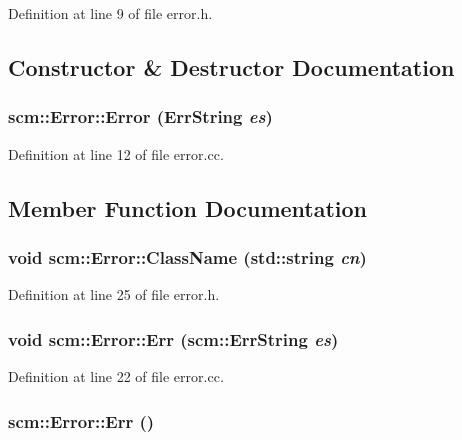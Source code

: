 Definition at line 9 of file error.h.



\subsection{Constructor \& Destructor Documentation}
\hypertarget{classscm_1_1_error_a9c6aa255ce180155a748f304f83830d3}{
\subsubsection[{Error}]{\setlength{\rightskip}{0pt plus 5cm}scm::Error::Error ({\bf ErrString} {\em es})}}
\label{classscm_1_1_error_a9c6aa255ce180155a748f304f83830d3}


Definition at line 12 of file error.cc.



\subsection{Member Function Documentation}
\hypertarget{classscm_1_1_error_a3d3598611ee2955f3144ec2602b69677}{
\subsubsection[{ClassName}]{\setlength{\rightskip}{0pt plus 5cm}void scm::Error::ClassName (std::string {\em cn})}}
\label{classscm_1_1_error_a3d3598611ee2955f3144ec2602b69677}


Definition at line 25 of file error.h.

\hypertarget{classscm_1_1_error_aa4309b2556e84bd9bc6c7871f3be2f7a}{
\subsubsection[{Err}]{\setlength{\rightskip}{0pt plus 5cm}void scm::Error::Err ({\bf scm::ErrString} {\em es})}}
\label{classscm_1_1_error_aa4309b2556e84bd9bc6c7871f3be2f7a}


Definition at line 22 of file error.cc.

\hypertarget{classscm_1_1_error_a8fa002269b2ea7b0af4581951a7908f0}{
\subsubsection[{Err}]{ scm::Error::Err ()}}
\label{classscm_1_1_error_a8fa002269b2ea7b0af4581951a7908f0}


